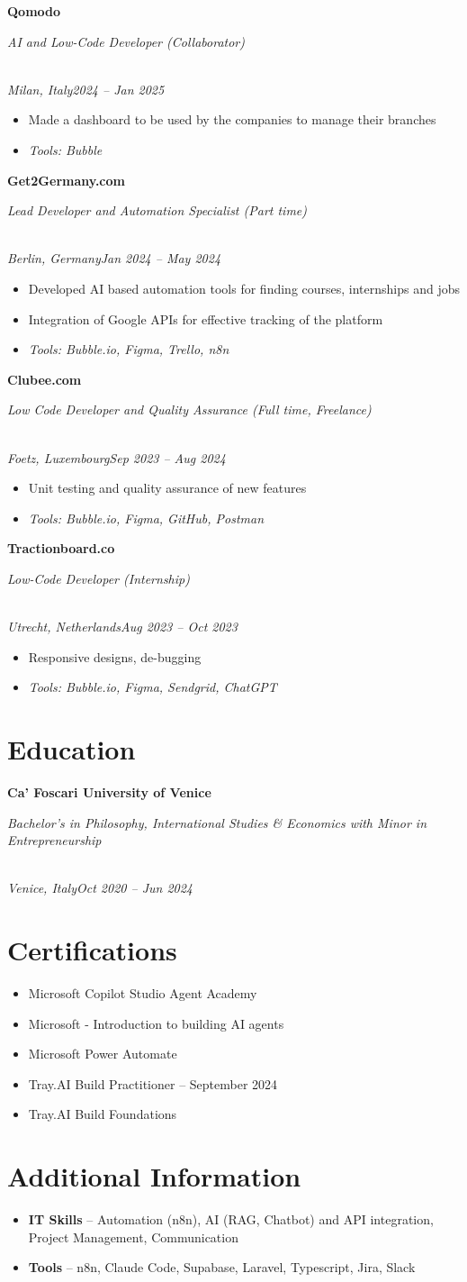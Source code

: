 \documentclass[a4paper,10pt]{article}
\newcommand{\role}[4]{\vspace{3pt}\noindent\hspace{0.6em}\parbox[t]{0.38\textwidth}{\raggedright\textbf{#1}}\hfill\parbox[t]{0.58\textwidth}{\raggedleft\textit{#2}}\\{\textit{#3}\hfill\textit{#4}}\vspace{1pt}}
\begin{document}
\role{Qomodo}{AI and Low-Code Developer (Collaborator)}{Milan, Italy}{2024 -- Jan 2025}
\begin{itemize}
\item Made a dashboard to be used by the companies to manage their branches
\item \textit{Tools: Bubble}
\end{itemize}

\role{Get2Germany.com}{Lead Developer and Automation Specialist (Part time)}{Berlin, Germany}{Jan 2024 -- May 2024}
\begin{itemize}
\item Developed AI based automation tools for finding courses, internships and jobs
\item Integration of Google APIs for effective tracking of the platform
\item \textit{Tools: Bubble.io, Figma, Trello, n8n}
\end{itemize}

\role{Clubee.com}{Low Code Developer and Quality Assurance (Full time, Freelance)}{Foetz, Luxembourg}{Sep 2023 -- Aug 2024}
\begin{itemize}
\item Unit testing and quality assurance of new features
\item \textit{Tools: Bubble.io, Figma, GitHub, Postman}
\end{itemize}

\role{Tractionboard.co}{Low-Code Developer (Internship)}{Utrecht, Netherlands}{Aug 2023 -- Oct 2023}
\begin{itemize}
\item Responsive designs, de-bugging
\item \textit{Tools: Bubble.io, Figma, Sendgrid, ChatGPT}
\end{itemize}

\section{Education}
\role{Ca' Foscari University of Venice}{Bachelor's in Philosophy, International Studies \& Economics with Minor in Entrepreneurship}{Venice, Italy}{Oct 2020 -- Jun 2024}

\section{Certifications}
\begin{itemize}
\item Microsoft Copilot Studio Agent Academy
\item Microsoft - Introduction to building AI agents
\item Microsoft Power Automate
\item Tray.AI Build Practitioner -- September 2024
\item Tray.AI Build Foundations
\end{itemize}

\section{Additional Information}
\begin{itemize}
\item \textbf{IT Skills} -- Automation (n8n), AI (RAG, Chatbot) and API integration, Project Management, Communication
\item \textbf{Tools} -- n8n, Claude Code, Supabase, Laravel, Typescript, Jira, Slack
\end{itemize}
\end{document}
